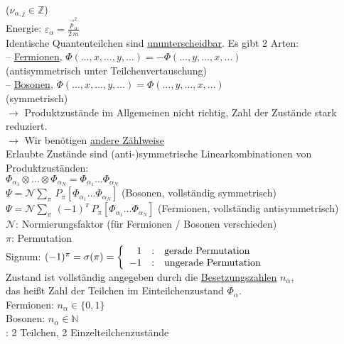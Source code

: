 \begin{tabbing}
($\nu_{\alpha,j} \in \mathbb{Z}$)\\
\>Energie: $\varepsilon_{\alpha} = \frac{\vec{p}_{\alpha}^2}{2\, m}$\\
Identische Quantenteilchen sind \underline{ununterscheidbar}. Es gibt 2 Arten:\\
-- \underline{ Fermionen}, \> \>$\Phi(\dots,x,\dots,y,\dots) = - \Phi(\dots,y,\dots,x,\dots)$\\
  \>\> (antisymmetrisch unter Teilchenvertauschung)\\
-- \underline{Bosonen}, \> \> $\Phi(\dots,x,\dots,y,\dots) = \Phi(\dots,y,\dots,x,\dots)$\\
  \>\> (symmetrisch)\\
$\rightarrow$ \> Produktzustände im Allgemeinen nicht richtig, Zahl der Zustände stark reduziert.\\
$\rightarrow$ \> Wir benötigen \underline{andere Zählweise}\\
Erlaubte Zustände sind (anti-)symmetrische Linearkombinationen von Produktzuständen:\\
\>$\Phi_{\alpha_1} \otimes \dots \otimes \Phi_{\alpha_N} = \Phi_{\alpha_1}\dots \Phi_{\alpha_N}$\\
\> $\Psi = \mathcal{N} \sum\limits_{\pi}\,P_{\pi}\left[\Phi_{\alpha_1}\dots \Phi_{\alpha_N}\right]$ \quad (Bosonen, vollständig symmetrisch)\\
\> $\Psi = \mathcal{N} \sum\limits_{\pi}\,(-1)^{\pi}\,P_{\pi}\left[\Phi_{\alpha_1}\dots \Phi_{\alpha_N}\right]$ \quad (Fermionen, vollständig antisymmetrisch)\\
\> $\mathcal{N}$: Normierungsfaktor (für Fermionen / Bosonen verschieden)\\
\> $\pi$: Permutation\\
\> Signum: $(-1)^{\pi} = \sigma(\pi) = \left\{ \begin{array}{r@{\quad : \quad} l }1 & \text{gerade Permutation}\\ -1 & \text{ungerade Permutation}\\\end{array}\right.$\\
Zustand ist vollständig angegeben durch die \underline{Besetzungszahlen} $n_{\alpha}$,\\
das heißt Zahl der Teilchen im Einteilchenzustand $\Phi_{\alpha}$.\\
\> Fermionen: $n_{\alpha} \in \{0,1\}$\\
\> Bosonen: $n_{\alpha} \in \mathbb{N}$\\
: 2 Teilchen, 2 Einzelteilchenzustände
\end{tabbing}

